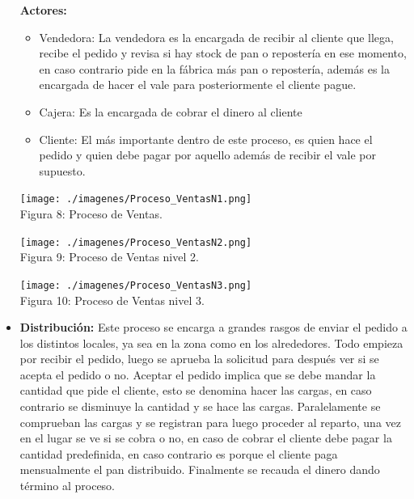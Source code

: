 \begin{itemize}
\textbf{Actores:}
\begin{itemize}
\item Vendedora: La vendedora es la encargada de recibir al cliente que llega, recibe el pedido y revisa si hay stock de pan o repostería en ese momento, en caso contrario pide en la fábrica más pan o repostería, además es la encargada de hacer el vale para posteriormente el cliente pague.
\item Cajera: Es la encargada de cobrar el dinero al cliente
\item Cliente: El más importante dentro de este proceso, es quien hace el pedido y quien debe pagar por aquello además de recibir el vale por supuesto.
\end{itemize} 

\begin{center}
\texttt{[image: ./imagenes/Proceso\_VentasN1.png]}\\
Figura 8: Proceso de Ventas.
\end{center}


\begin{center}
\texttt{[image: ./imagenes/Proceso\_VentasN2.png]}\\
Figura 9: Proceso de Ventas nivel 2.
\end{center}


\begin{center}
\texttt{[image: ./imagenes/Proceso\_VentasN3.png]}\\
Figura 10: Proceso de Ventas nivel 3.
\end{center}


\item \textbf{Distribución:} Este proceso se encarga a grandes rasgos de enviar el pedido a los distintos locales, ya sea en la zona como en los alrededores. Todo empieza por recibir el pedido, luego se aprueba la solicitud para después ver si se acepta el pedido o no. Aceptar el pedido implica que se debe mandar la cantidad que pide el cliente, esto se denomina hacer las cargas, en caso contrario se disminuye la cantidad y se hace las cargas. Paralelamente se comprueban las cargas y se registran para luego proceder al reparto, una vez en el lugar se ve si se cobra o no, en caso de cobrar el cliente debe pagar la cantidad predefinida, en caso contrario es porque el cliente paga mensualmente el pan distribuido. Finalmente se recauda el dinero dando término al proceso.


\end{itemize}
